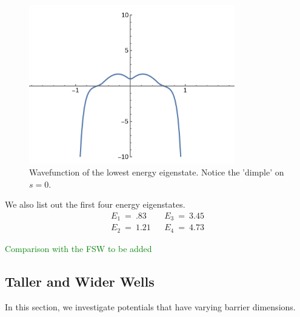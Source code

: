 \documentclass{article}
\numberwithin{equation}{section}
\begin{document}
\begin{figure}[h]
    \centering
    \includegraphics[width=0.8\textwidth]{III2_dimple.png} %
    \caption{Wavefunction of the lowest energy eigenstate. 
    Notice the 'dimple' on $s = 0$. }
    \label{fig:example}
\end{figure}


We also list out the first four energy eigenstates. 
\begin{align}
    E_1 \ = \ .83 && E_3 \ = \ 3.45 \nonumber\\ 
    E_2 \ = \ 1.21 && E_4 \ = \ 4.73
\end{align}


\textcolor{green}{Comparison with the FSW to be added}

\subsection{Taller and Wider Wells}

In this section, we investigate potentials 
that have varying barrier dimensions. 
\end{document}
